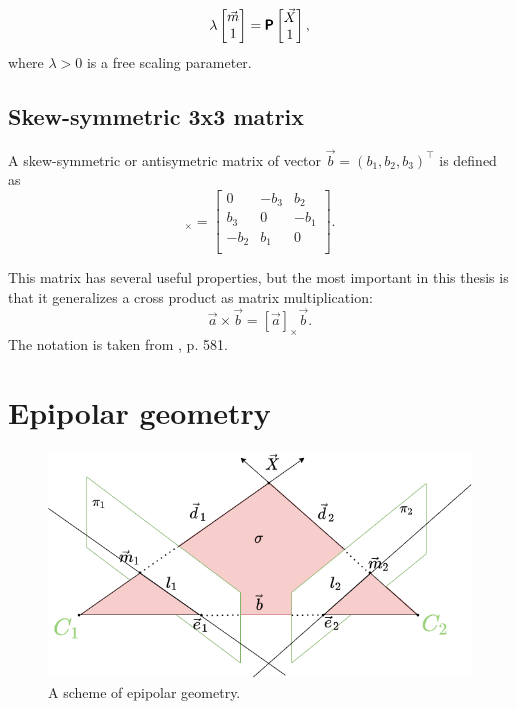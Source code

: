 \begin{equation}
    \label{eq:proj_min}
    \lambda 
    \begin{bmatrix} 
    \vec{m} \\ 1 \end{bmatrix} = \pmb{\mathsf{P}} \begin{bmatrix} \vec{X} \\ 1
    \end{bmatrix},
\end{equation}
where $\lambda > 0$ is a free scaling parameter.

\subsection{Skew-symmetric 3x3 matrix}
A skew-symmetric or antisymetric matrix of vector $\vec{b} = (b_1, b_2, b_3)^\top$ is defined as
\begin{equation}
    [\vec{b}]_{\times} = \begin{bmatrix}
        0 & -b_3 & b_2 \\ 
        b_3 & 0 & -b_1 \\ 
        -b_2 & b_1 & 0 \\ 
    \end{bmatrix}.
\end{equation}

This matrix has several useful properties, but the most important in this thesis is that it generalizes a cross product as matrix multiplication:
\begin{equation}
    \vec{a} \times \vec{b} = [\vec{a}]_{\times} \vec{b}.
\end{equation}
The notation is taken from \cite{hartley_zisserman_2004}, p. 581.

\section{Epipolar geometry}

\label{sec:epipolar_geometry}
\begin{figure}[ht]
    \centering
    \includegraphics[width=\textwidth]{graphics/epipolar.png}
    \caption{A scheme of epipolar geometry.}
    \label{fig:epipolar_std}
\end{figure}

